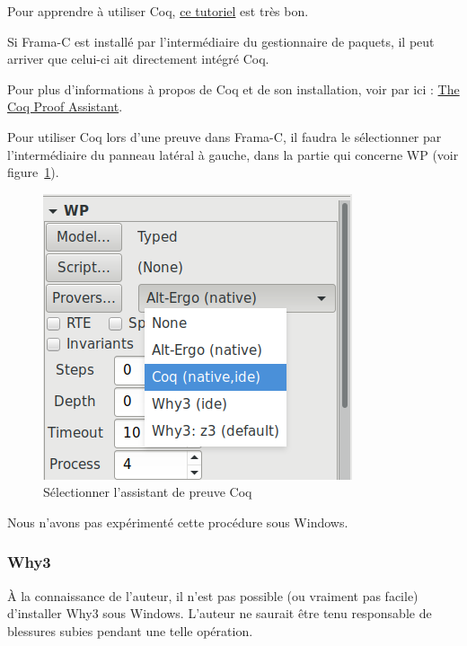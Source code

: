 \documentclass[12pt,francais,]{scrbook}
\newenvironment{zdsalertblock}[1]{%
  \tcolorbox[beamer,%
    noparskip,breakable,
    colback=LightCoral,colframe=DarkRed,%
    colbacklower=Tomato,%
    title=#1]
}{\endtcolorbox}
\newenvironment{zdsblock}[1]{%
  \tcolorbox[beamer,%
    noparskip,breakable,
    colback=LightBlue,colframe=DarkBlue,%
    colbacklower=DarkBlue,%
    title=#1]
}{\endtcolorbox}
\begin{document}
Pour apprendre à utiliser Coq,
\href{http://www.cis.upenn.edu/~bcpierce/sf/current/index.html}{ce
tutoriel} est très bon.

\begin{zdsblock}{Information}
Si Frama-C est installé par
l'intermédiaire du gestionnaire de paquets, il peut
arriver que celui-ci ait directement intégré Coq.
\end{zdsblock}

Pour plus d'informations à propos de Coq et de son installation, voir
par ici : \href{https://coq.inria.fr/}{The Coq Proof Assistant}.

Pour utiliser Coq lors d'une preuve dans Frama-C, il faudra le
sélectionner par l'intermédiaire du panneau latéral à gauche, dans la
partie qui concerne WP (voir figure~\ref{fig:select-coq}).

\begin{figure}[htbp]
\centering
\includegraphics[scale=0.5]{1-2-select-coq.png}
\caption{Sélectionner l'assistant de preuve Coq}
\label{fig:select-coq}
\end{figure}

\begin{zdsblock}{Information}
  Nous n'avons pas expérimenté cette procédure sous Windows.
\end{zdsblock}
  
\subsubsection{Why3}\label{why3}

\begin{zdsalertblock}{Attention}
  À la connaissance de l'auteur, il n'est
  pas possible (ou vraiment pas facile) d'installer Why3 sous
  Windows. L'auteur ne saurait être tenu responsable de
  blessures subies pendant une telle opération.
\end{zdsalertblock}
\end{document}
